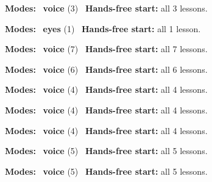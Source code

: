 \expandafter\def\csname hlchaptermodality39\endcsname{%
  {\small\noindent
    \textbf{Modes:} \hlvoicesign{}~\textbf{voice} (3)\quad
    \hlvoicesign{}~\textbf{Hands-free start:} all 3 lessons.%
    \par}\medskip
}

\expandafter\def\csname hlchaptermodality40\endcsname{%
  {\small\noindent
    \textbf{Modes:} \hlsightsign{}~\textbf{eyes} (1)\quad
    \hlvoicesign{}~\textbf{Hands-free start:} all 1 lesson.%
    \par}\medskip
}

\expandafter\def\csname hlchaptermodality41\endcsname{%
  {\small\noindent
    \textbf{Modes:} \hlvoicesign{}~\textbf{voice} (7)\quad
    \hlvoicesign{}~\textbf{Hands-free start:} all 7 lessons.%
    \par}\medskip
}

\expandafter\def\csname hlchaptermodality42\endcsname{%
  {\small\noindent
    \textbf{Modes:} \hlvoicesign{}~\textbf{voice} (6)\quad
    \hlvoicesign{}~\textbf{Hands-free start:} all 6 lessons.%
    \par}\medskip
}

\expandafter\def\csname hlchaptermodality43\endcsname{%
  {\small\noindent
    \textbf{Modes:} \hlvoicesign{}~\textbf{voice} (4)\quad
    \hlvoicesign{}~\textbf{Hands-free start:} all 4 lessons.%
    \par}\medskip
}

\expandafter\def\csname hlchaptermodality44\endcsname{%
  {\small\noindent
    \textbf{Modes:} \hlvoicesign{}~\textbf{voice} (4)\quad
    \hlvoicesign{}~\textbf{Hands-free start:} all 4 lessons.%
    \par}\medskip
}

\expandafter\def\csname hlchaptermodality45\endcsname{%
  {\small\noindent
    \textbf{Modes:} \hlvoicesign{}~\textbf{voice} (4)\quad
    \hlvoicesign{}~\textbf{Hands-free start:} all 4 lessons.%
    \par}\medskip
}

\expandafter\def\csname hlchaptermodality46\endcsname{%
  {\small\noindent
    \textbf{Modes:} \hlvoicesign{}~\textbf{voice} (5)\quad
    \hlvoicesign{}~\textbf{Hands-free start:} all 5 lessons.%
    \par}\medskip
}

\expandafter\def\csname hlchaptermodality47\endcsname{%
  {\small\noindent
    \textbf{Modes:} \hlvoicesign{}~\textbf{voice} (5)\quad
    \hlvoicesign{}~\textbf{Hands-free start:} all 5 lessons.%
    \par}\medskip
}

